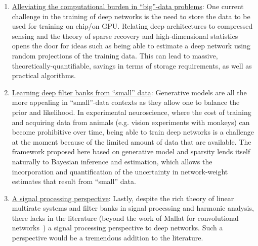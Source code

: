 \documentclass[12pt]{article}
\begin{document}
\begin{enumerate}
	\item \underline{Alleviating the computational burden in ``big''-data problems}: One current challenge in the training of deep networks is the need to store the data to be used for training on chip/on GPU. Relating deep architectures to compressed sensing and the theory of sparse recovery and high-dimensional statistics opens the door for ideas such as being able to estimate a deep network using random projections of the training data. This can lead to massive, theoretically-quantifiable, savings in terms of storage requirements, as well as practical algorithms.

	\item \underline{Learning deep filter banks from ``small'' data}: Generative models are all the more appealing in ``small''-data contexts as they allow one to balance the prior and likelihood. In experimental neuroscience, where the cost of training and acquiring data from animals (e.g. vision experiments with monkeys) can become prohibitive over time, being able to train deep networks is a challenge at the moment because of the limited amount of data that are available. The framework proposed here based on generative model and sparsity lends itself naturally to Bayesian inference and estimation, which allows the incorporation and quantification of the uncertainty in network-weight estimates that result from ``small'' data.
	
	\item \underline{A signal processing perspective}: Lastly, despite the rich theory of linear multirate systems and filter banks in signal processing and harmonic analysis, there lacks in the literature (beyond the work of Mallat for convolutional networks~\cite{bruna2013invariant}) a signal processing perspective to deep networks. Such a perspective would be a tremendous addition to the literature.
		
\end{enumerate}

%

%
\end{document}
